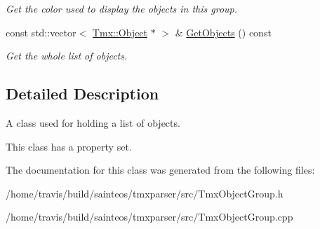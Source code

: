 \begin{DoxyCompactItemize}
\begin{DoxyCompactList}\small\item\em Get the color used to display the objects in this group. \end{DoxyCompactList}\item 
\hypertarget{classTmx_1_1ObjectGroup_a7581c383af6ed4f4e7d3a4dda3b89c44}{const std\-::vector$<$ \hyperlink{classTmx_1_1Object}{Tmx\-::\-Object} $\ast$ $>$ \& \hyperlink{classTmx_1_1ObjectGroup_a7581c383af6ed4f4e7d3a4dda3b89c44}{Get\-Objects} () const }\label{classTmx_1_1ObjectGroup_a7581c383af6ed4f4e7d3a4dda3b89c44}

\begin{DoxyCompactList}\small\item\em Get the whole list of objects. \end{DoxyCompactList}\end{DoxyCompactItemize}


\subsection{Detailed Description}
A class used for holding a list of objects. 

This class has a property set. 

The documentation for this class was generated from the following files\-:\begin{DoxyCompactItemize}
\item 
/home/travis/build/sainteos/tmxparser/src/Tmx\-Object\-Group.\-h\item 
/home/travis/build/sainteos/tmxparser/src/Tmx\-Object\-Group.\-cpp\end{DoxyCompactItemize}
